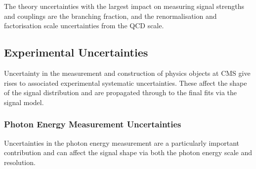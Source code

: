 The theory uncertainties with the largest impact on measuring signal strengths and couplings are the \Hgg branching fraction, and the renormalisation and factorisation scale uncertainties from the QCD scale. 



\subsection{Experimental Uncertainties}
Uncertainty in the measurement and construction of physics objects at CMS give rises to associated experimental systematic uncertainties. 
These affect the shape of the signal distribution and are propagated through to the final fits via the signal model. 
\subsubsection{Photon Energy Measurement Uncertainties}
Uncertainties in the photon energy measurement are a particularly important contribution and can affect the signal shape via both the photon energy scale and resolution.
